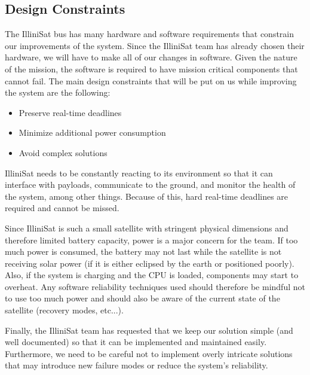 \subsection{Design Constraints}
The IlliniSat bus has many hardware and software requirements that constrain our
improvements of the system. Since the IlliniSat team has already chosen their
hardware, we will have to make all of our changes in software. Given the nature
of the mission, the software is required to have mission critical components
that cannot fail. The main design constraints that will be put on us while improving the system are the following:
\begin{itemize}
  \item Preserve real-time deadlines
  \item Minimize additional power consumption
  \item Avoid complex solutions
\end{itemize}
IlliniSat needs to be constantly reacting to its environment so that it can
interface with payloads, communicate to the ground, and monitor the health of
the system, among other things. Because of this, hard real-time deadlines are
required and cannot be missed. 

Since IlliniSat is such a small satellite with stringent physical dimensions and
therefore limited battery capacity, power is a major concern for the team.  If
too much power is consumed, the battery may not last while the satellite is not
receiving solar power (if it is either eclipsed by the earth or positioned
poorly).  Also, if the system is charging and the CPU is loaded, components may
start to overheat.  Any software reliability techniques used should therefore be
mindful not to use too much power and should also be aware of the current state
of the satellite (recovery modes, etc...).

Finally, the IlliniSat team has requested that we keep our solution simple (and
well documented) so that it can be implemented and maintained easily.
Furthermore, we need to be careful not to implement overly intricate solutions
that may introduce new failure modes or reduce the system's reliability.
